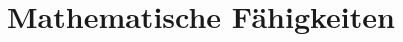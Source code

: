 \documentclass[a4paper]{article}
\begin{document}
\subsubsection{}

\subsubsection{}

\subsubsection{}



\section{Mathematische Fähigkeiten}

\subsection{}

\subsubsection{}
\end{document}
